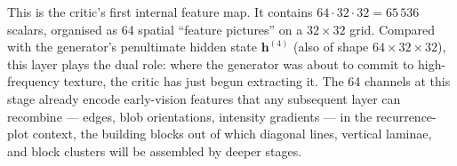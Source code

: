 
This is the critic's first internal feature map. It contains
$64 \cdot 32 \cdot 32 = 65\,536$ scalars, organised as 64 spatial
``feature pictures'' on a $32 \times 32$ grid. Compared with the
generator's penultimate hidden state $\mathbf{h}^{(4)}$ (also of shape
$64 \times 32 \times 32$), this layer plays the dual role: where the
generator was about to commit to high-frequency texture, the critic
has just begun extracting it. The 64 channels at this stage already
encode early-vision features that any subsequent layer can recombine ---
edges, blob orientations, intensity gradients --- in the
recurrence-plot context, the building blocks out of which diagonal
lines, vertical laminae, and block clusters will be assembled by
deeper stages.
